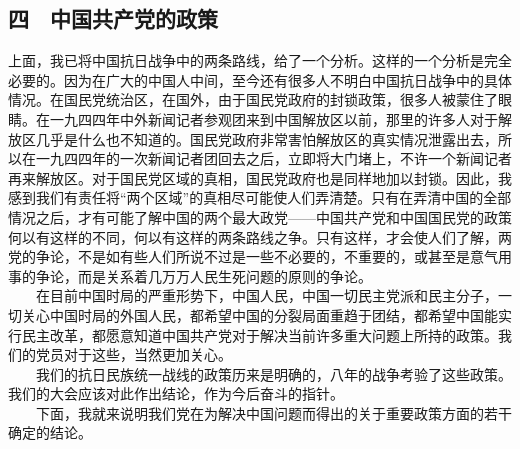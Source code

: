 \documentclass[cn,11pt,chinese]{elegantbook}
\def\myformat#1{\hfil\hfil #1}
\begin{document}
\subsection*{\myformat{四　中国共产党的政策}}
上面，我已将中国抗日战争中的两条路线，给了一个分析。这样的一个分析是完全必要的。因为在广大的中国人中间，至今还有很多人不明白中国抗日战争中的具体情况。在国民党统治区，在国外，由于国民党政府的封锁政策，很多人被蒙住了眼睛。在一九四四年中外新闻记者参观团来到中国解放区以前，那里的许多人对于解放区几乎是什么也不知道的。国民党政府非常害怕解放区的真实情况泄露出去，所以在一九四四年的一次新闻记者团回去之后，立即将大门堵上，不许一个新闻记者再来解放区。对于国民党区域的真相，国民党政府也是同样地加以封锁。因此，我感到我们有责任将“两个区域”的真相尽可能使人们弄清楚。只有在弄清中国的全部情况之后，才有可能了解中国的两个最大政党——中国共产党和中国国民党的政策何以有这样的不同，何以有这样的两条路线之争。只有这样，才会使人们了解，两党的争论，不是如有些人们所说不过是一些不必要的，不重要的，或甚至是意气用事的争论，而是关系着几万万人民生死问题的原则的争论。\\
　　在目前中国时局的严重形势下，中国人民，中国一切民主党派和民主分子，一切关心中国时局的外国人民，都希望中国的分裂局面重趋于团结，都希望中国能实行民主改革，都愿意知道中国共产党对于解决当前许多重大问题上所持的政策。我们的党员对于这些，当然更加关心。\\
　　我们的抗日民族统一战线的政策历来是明确的，八年的战争考验了这些政策。我们的大会应该对此作出结论，作为今后奋斗的指针。\\
　　下面，我就来说明我们党在为解决中国问题而得出的关于重要政策方面的若干确定的结论。\\
\end{document}
